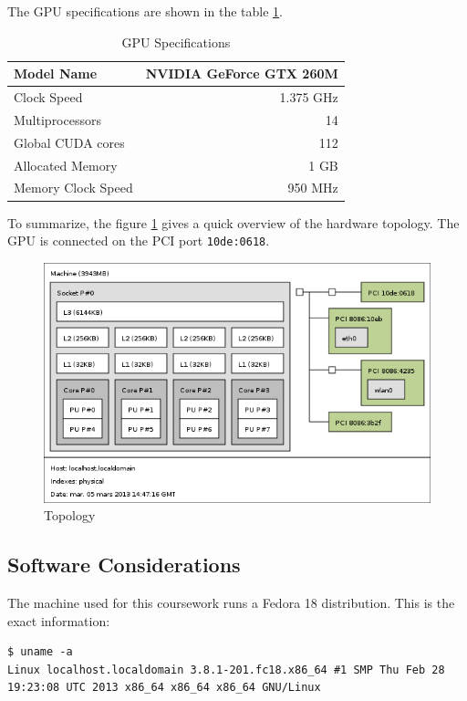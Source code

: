 \documentclass{egpubl}
\begin{document}
The GPU specifications are shown in the table \ref{GPUspecs}.

\begin{table}[h]
\centering
\begin{tabular}{|l|r|}
\hline
Model Name & NVIDIA GeForce GTX 260M \\
\hline
Clock Speed & 1.375 GHz \\
\hline
Multiprocessors & 14 \\
\hline
Global CUDA cores & 112 \\
\hline
Allocated Memory & 1 GB \\
\hline
Memory Clock Speed & 950 MHz \\
\hline
\end{tabular}
\caption{GPU Specifications}
\label{GPUspecs}
\end{table}

To summarize, the figure \ref{topo} gives a quick overview of the hardware topology. The GPU is connected on the PCI port \verb+10de:0618+.

\begin{figure}[h]
\centering
\includegraphics[scale=0.35]{topo.png}
\caption{Topology}
\label{topo}
\end{figure}

\subsection{Software Considerations}

The machine used for this coursework runs a Fedora 18 distribution. This is the exact information:
\begin{lstlisting}
$ uname -a
Linux localhost.localdomain 3.8.1-201.fc18.x86_64 #1 SMP Thu Feb 28 19:23:08 UTC 2013 x86_64 x86_64 x86_64 GNU/Linux
\end{lstlisting}
\end{document}
